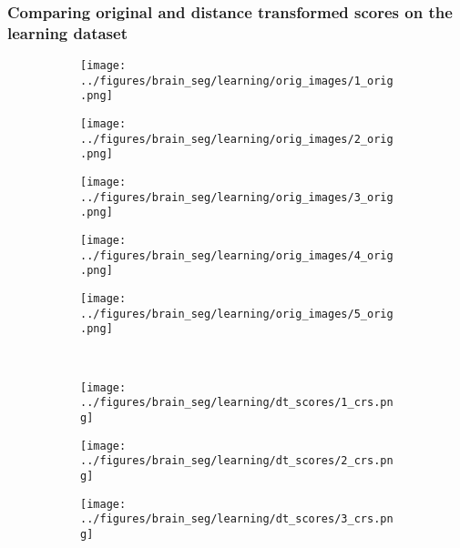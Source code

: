 \subsubsection{Comparing original and distance transformed scores on the learning dataset}\label{brainlearn}
\begin{figure}[h!] %
	\centering
	\begin{subfigure}{0.16\textwidth}
		\centering
		\texttt{[image: ../figures/brain\_seg/learning/orig\_images/1\_orig.png]}
		\label{fig:1}
	\end{subfigure}
	\begin{subfigure}{0.16\textwidth}
		\centering
		\texttt{[image: ../figures/brain\_seg/learning/orig\_images/2\_orig.png]}
		\label{fig:2}
	\end{subfigure}
	\begin{subfigure}{0.16\textwidth}
		\centering
		\texttt{[image: ../figures/brain\_seg/learning/orig\_images/3\_orig.png]}
		\label{fig:3}
	\end{subfigure}
	\begin{subfigure}{0.16\textwidth}
		\centering
		\texttt{[image: ../figures/brain\_seg/learning/orig\_images/4\_orig.png]}
		\label{fig:4}
	\end{subfigure}
	\begin{subfigure}{0.16\textwidth}
		\centering
		\texttt{[image: ../figures/brain\_seg/learning/orig\_images/5\_orig.png]}
		\label{fig:5}
	\end{subfigure}
	\\
	\vspace{-0.35cm}
	\begin{subfigure}{0.16\textwidth}
		\centering
		\texttt{[image: ../figures/brain\_seg/learning/dt\_scores/1\_crs.png]}
		\label{fig:6}
	\end{subfigure}
	\begin{subfigure}{0.16\textwidth}
		\centering
		\texttt{[image: ../figures/brain\_seg/learning/dt\_scores/2\_crs.png]}
		\label{fig:7}
	\end{subfigure}
	\begin{subfigure}{0.16\textwidth}
		\centering
		\texttt{[image: ../figures/brain\_seg/learning/dt\_scores/3\_crs.png]}
		\label{fig:8}
	\end{subfigure}

\end{figure}
